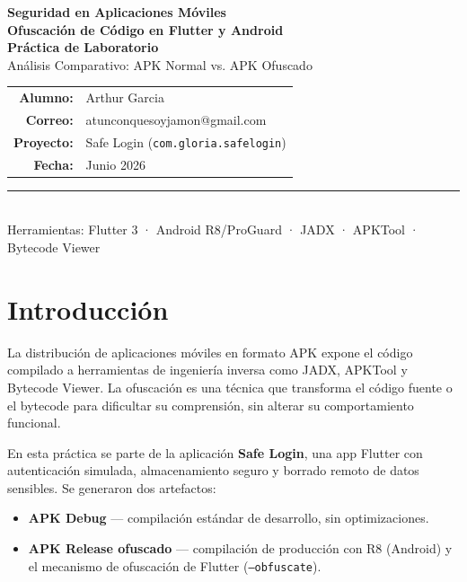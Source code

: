 \documentclass[12pt,a4paper]{article}
\begin{document}
\begin{titlepage}
  \centering
  \vspace*{1.5cm}
  {\Huge\bfseries\color{azulTitulo} Seguridad en Aplicaciones Móviles\\[0.4em]
   \Large\color{grisOscuro} Ofuscación de Código en Flutter y Android}\\[2cm]

  {\large\bfseries Práctica de Laboratorio}\\[0.3cm]
  {\normalsize Análisis Comparativo: APK Normal vs. APK Ofuscado}\\[2.5cm]

  \begin{tabular}{rl}
    \textbf{Alumno:}    & Arthur Garcia \\[0.2em]
    \textbf{Correo:}    & atunconquesoyjamon@gmail.com \\[0.2em]
    \textbf{Proyecto:}  & Safe Login (\texttt{com.gloria.safelogin}) \\[0.2em]
    \textbf{Fecha:}     & Junio 2026 \\
  \end{tabular}

  \vfill
  \rule{\linewidth}{0.5pt}\\[0.3em]
  {\small Herramientas: Flutter 3 · Android R8/ProGuard · JADX · APKTool · Bytecode Viewer}
\end{titlepage}

\tableofcontents
\newpage

\section{Introducción}

La distribución de aplicaciones móviles en formato APK expone el código compilado a herramientas de ingeniería inversa como JADX, APKTool y Bytecode Viewer. La ofuscación es una técnica que transforma el código fuente o el bytecode para dificultar su comprensión, sin alterar su comportamiento funcional.

En esta práctica se parte de la aplicación \textbf{Safe Login}, una app Flutter con autenticación simulada, almacenamiento seguro y borrado remoto de datos sensibles. Se generaron dos artefactos:

\begin{itemize}
  \item \textbf{APK Debug} — compilación estándar de desarrollo, sin optimizaciones.
  \item \textbf{APK Release ofuscado} — compilación de producción con R8 (Android) y el mecanismo de ofuscación de Flutter (\texttt{--obfuscate}).
\end{itemize}
\end{document}
